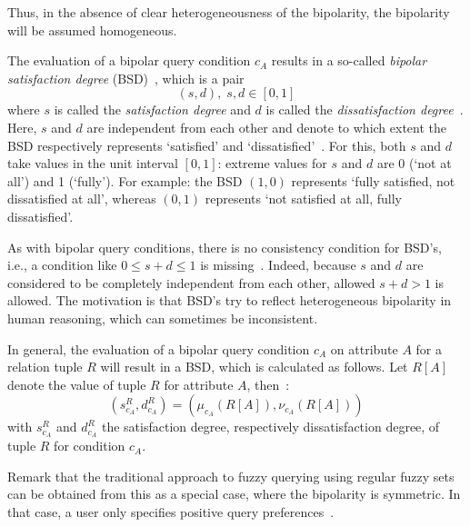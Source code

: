 \documentclass[runningheads,a4paper]{llncs}
\begin{document}
Thus, in the absence of clear heterogeneousness of the bipolarity, the bipolarity will be assumed homogeneous.

The evaluation of a bipolar query condition $c_A$ results in a so-called {\em bipolar satisfaction degree} (BSD)~\cite{Matthe2011ijis}, which is a pair
\begin{equation}
(s,d),\; s,d \in [0,1] \nonumber
\end{equation}
where $s$ is called the \emph{satisfaction degree} and $d$ is called the \emph{dissatisfaction degree}~\cite{Matthe2011ijis}. Here, $s$ and $d$ are independent from each other and denote to which extent the BSD respectively represents `satisfied' and `dissatisfied'~\cite{Matthe2011ijis}. For this, both $s$ and $d$ take values in the unit interval $[0,1]$: extreme values for $s$ and $d$ are 0 (`not at all') and 1 (`fully'). For example: the BSD $(1,0)$ represents `fully satisfied, not dissatisfied at all', whereas $(0,1)$ represents `not satisfied at all, fully dissatisfied'.

As with bipolar query conditions, there is no consistency condition for BSD's, i.e., a condition like $0\leq s+d\leq 1$ is missing~\cite{Matthe2011ijis}. Indeed, because $s$ and $d$ are considered to be completely independent from each other, allowed $s+d>1$ is allowed. The motivation is that BSD's try to reflect heterogeneous bipolarity in human reasoning, which can sometimes be inconsistent.

In general, the evaluation of a bipolar query condition $c_{A}$ on attribute $A$ for a relation tuple $R$ will result in a BSD, which is calculated as follows. Let $R[A]$ denote the value of tuple $R$ for attribute $A$, then~\cite{Matthe2011ijis}:
\begin{equation}\label{eq:bsdeval}
(s_{c_A}^R, d_{c_A}^R)=(\mu_{c_A}(R[A]), \nu_{c_A}(R[A]))
\end{equation}
with $s_{c_A}^R$ and $d_{c_A}^R$ the satisfaction degree, respectively dissatisfaction degree, of tuple $R$ for condition $c_A$.

Remark that the traditional approach to fuzzy querying using regular fuzzy sets can be obtained from this as a special case, where the bipolarity is symmetric. In that case, a user only specifies positive query preferences~\cite{Matthe2011ijis}.
\end{document}

